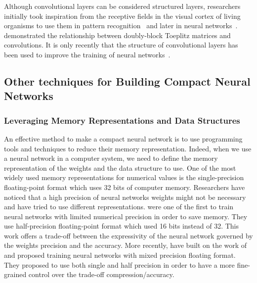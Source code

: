 Although convolutional layers can be considered structured layers, researchers initially took inspiration from the receptive fields in the visual cortex of living organisms to use them in pattern recognition~\cite{hubel1959receptive,hubel1968receptive} and later in neural networks~\cite{fukushima1982neocognitron}.
\citet{jain1989fundamentals} demonstrated the relationship between doubly-block Toeplitz matrices and convolutions.
It is only recently that the structure of convolutional layers has been used to improve the training of neural networks~\cite{sedghi2018singular}.









\subsection{Other techniques for Building Compact Neural Networks}
\label{subsection:ch3-other_techniques_for_building_compact_neural_networks}



\subsubsection{Leveraging Memory Representations and Data Structures}

An effective method to make a compact neural network is to use programming tools and techniques to reduce their memory representation. 
Indeed, when we use a neural network in a computer system, we need to define the memory representation of the weights and the data structure to use.
One of the most widely used memory representations for numerical values is the single-precision floating-point format which uses 32 bits of computer memory.
Researchers have noticed that a high precision of neural networks weights might not be necessary and have tried to use different representations.
\citet{gupta2015deep} were one of the first to train neural networks with limited numerical precision in order to save memory.
They use half-precision floating-point format which used 16 bits instead of 32.
This work offers a trade-off between the expressivity of the neural network governed by the weights precision and the accuracy.
More recently, \citet{micikevicius2018mixed} have built on the work of~\citet{gupta2015deep} and proposed training neural networks with mixed precision floating format.
They proposed to use both single and half precision in order to have a more fine-grained control over the trade-off compression/accuracy.

